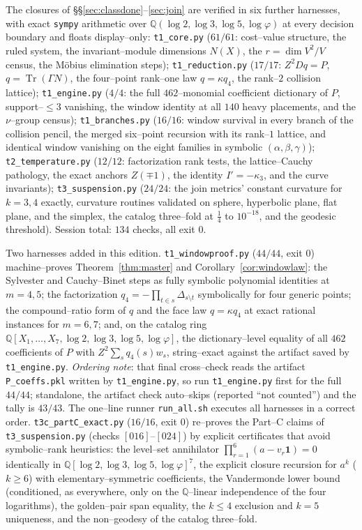\documentclass[11pt]{article}
\theoremstyle{definition}
\newcommand{\ph}{\varphi}
\newcommand{\Q}{\mathbb{Q}}
\begin{document}
The closures of \S\S\ref{sec:classdone}--\ref{sec:join} are verified in six further harnesses,
with exact \texttt{sympy} arithmetic over $\Q(\log2,\log3,\log5,\log\ph)$ at every decision
boundary and floats display--only: \texttt{t1\_core.py} ($61/61$: cost--value structure, the ruled
system, the invariant--module dimensions $N(X)$, the $r=\dim V^2/V$ census, the M\"obius elimination
steps); \texttt{t1\_reduction.py} ($17/17$: $Z^2Dq=P$, $q=\operatorname{Tr}(\Gamma N)$, the
four--point rank--one law $q=\kappa q_4$, the rank--$2$ collision lattice); \texttt{t1\_engine.py}
($4/4$: the full $462$--monomial coefficient dictionary of $P$, support--$\le3$ vanishing, the window
identity at all $140$ heavy placements, and the $\nu$--group census); \texttt{t1\_branches.py}
($16/16$: window survival in every branch of the collision pencil, the merged six--point recursion
with its rank--$1$ lattice, and identical window vanishing on the eight families in symbolic
$(\alpha,\beta,\gamma)$); \texttt{t2\_temperature.py} ($12/12$: factorization rank tests, the
lattice--Cauchy pathology, the exact anchors $Z(\mp1)$, the identity $I'=-\kappa_3$, and the curve
invariants); \texttt{t3\_suspension.py} ($24/24$: the join metrics' constant curvature for $k=3,4$
exactly, curvature routines validated on sphere, hyperbolic plane, flat plane, and the simplex, the
catalog three--fold at $\tfrac14$ to $10^{-18}$, and the geodesic threshold). Session total: $134$
checks, all exit $0$.

Two harnesses added in this edition. \texttt{t1\_windowproof.py} ($44/44$, exit $0$) machine--proves
Theorem~\ref{thm:master} and Corollary~\ref{cor:windowlaw}: the Sylvester and Cauchy--Binet steps as
fully symbolic polynomial identities at $m=4,5$; the factorization
$q_4=-\prod_{t\in s}\Delta_{s\setminus t}$ symbolically for four generic points; the compound--ratio
form of $q$ and the face law $q=\kappa q_4$ at exact rational instances for $m=6,7$; and, on the
catalog ring $\Q[X_1,\dots,X_7,\log2,\log3,\log5,\log\ph]$, the dictionary--level equality of all
$462$ coefficients of $P$ with $Z^2\sum_sq_4(s)w_s$, string--exact against the artifact saved by
\texttt{t1\_engine.py}. \emph{Ordering note}: that final cross--check reads the artifact
\texttt{P\_coeffs.pkl} written by \texttt{t1\_engine.py}, so run \texttt{t1\_engine.py} first for the
full $44/44$; standalone, the artifact check auto--skips (reported ``not counted'') and the tally is
$43/43$. The one--line runner \texttt{run\_all.sh} executes all harnesses in a correct order. \texttt{t3c\_partC\_exact.py} ($16/16$, exit $0$) re--proves the Part--C
claims of \texttt{t3\_suspension.py} (checks $[016]$--$[024]$) by explicit certificates that avoid
symbolic--rank heuristics: the level--set annihilator $\prod_{r=1}^{6}(a-v_r\mathbf 1)=0$ identically
in $\Q[\log2,\log3,\log5,\log\ph]^7$, the explicit closure recursion for $a^k$ ($k\ge6$) with
elementary--symmetric coefficients, the Vandermonde lower bound (conditioned, as everywhere, only on
the $\Q$--linear independence of the four logarithms), the golden--pair span equality, the $k\le4$
exclusion and $k=5$ uniqueness, and the non--geodesy of the catalog three--fold.
\end{document}
